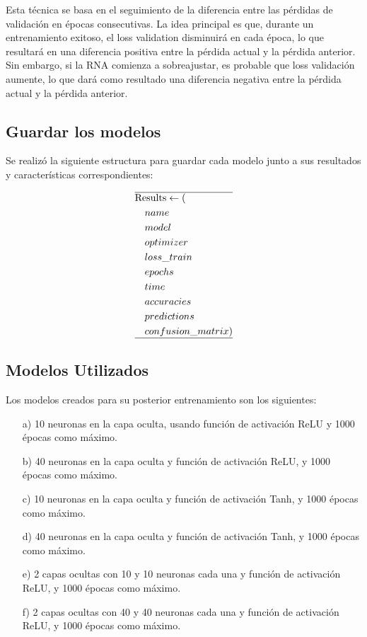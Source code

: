 \documentclass[journal]{IEEEtai}
\begin{document}
\hfill \break

Esta técnica se basa en el seguimiento de la diferencia entre las pérdidas de validación en épocas consecutivas. La idea principal es que, durante un entrenamiento exitoso, el loss validation disminuirá en cada época, lo que resultará en una diferencia positiva entre la pérdida actual y la pérdida anterior. Sin embargo, si la RNA comienza a sobreajustar, es probable que loss validación aumente, lo que dará como resultado una diferencia negativa entre la pérdida actual y la pérdida anterior. 

\subsection{Guardar los modelos}

Se realizó la siguiente estructura para guardar cada modelo junto a sus resultados y características correspondientes:

\begin{align*}
\hline
&\text{Results} \leftarrow (\\
&\quad name \\
&\quad model \\
&\quad optimizer \\
&\quad loss\_train \\
&\quad epochs \\
&\quad time  \\
&\quad accuracies \\
&\quad predictions \\
&\quad confusion\_matrix )\\
\hline
\end{align*}

\subsection{Modelos Utilizados}

Los modelos creados para su posterior entrenamiento son los siguientes:

\begin{itemize}
\item[a)]	10 neuronas en la capa oculta, usando función de activación ReLU y 1000 épocas como máximo.
\item[b)]	40 neuronas en la capa oculta y función de activación ReLU, y 1000 épocas como máximo.
\item[c)]	10 neuronas en la capa oculta y función de activación Tanh, y 1000 épocas como máximo.
\item[d)] 40 neuronas en la capa oculta y función de activación Tanh, y 1000 épocas como máximo.
\item[e)] 2 capas ocultas con 10 y 10 neuronas cada una y función de activación ReLU, y 1000 épocas como máximo.
\item[f)] 2 capas ocultas con 40 y 40 neuronas cada una y función de activación ReLU, y 1000 épocas como máximo.
\end{itemize}
\end{document}
